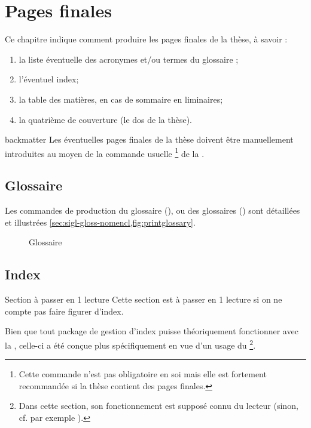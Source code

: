 \chapter{Pages finales}
\label{cha:pages-finales}

Ce chapitre indique comment produire les pages finales de la thèse,
à savoir :
\begin{enumerate}
\item la liste éventuelle des acronymes et/ou
  termes du glossaire ;
\item l'éventuel index;
\item la table des matières, en cas de sommaire en \glspl{liminaire};
\item la quatrième de couverture (le dos de la thèse).
\end{enumerate}

\begin{docCommand}{backmatter}{}
  Les éventuelles pages finales de la thèse doivent être manuellement
  introduites au moyen de la commande usuelle
  \footnote{Cette commande n'est pas obligatoire en
    soi mais elle est fortement recommandée si la thèse contient des pages
    finales.} de la \nofrontmatter.
\end{docCommand}

\section{Glossaire}

Les commandes de production du glossaire (), ou
des glossaires () sont détaillées et illustrées
\vref{sec:sigl-gloss-nomencl,fig:printglossary}.

\begin{figure}[htbp]
  \centering
  \caption{Glossaire}
  \label{fig:printglossary}
\end{figure}

\section{Index}

\begin{dbremark*}{Section à passer en 1\iere{} lecture}
  Cette section est à passer en 1\iere{} lecture si on ne compte pas faire
  figurer d'index.
\end{dbremark*}

Bien que tout package de gestion d'index puisse théoriquement fonctionner avec
la \yatcl, celle-ci a été conçue plus spécifiquement en vue d'un usage du
\footnote{Dans cette section, son fonctionnement est supposé
  connu du lecteur (sinon, cf. par exemple \cite{en-ligne7}).}.

